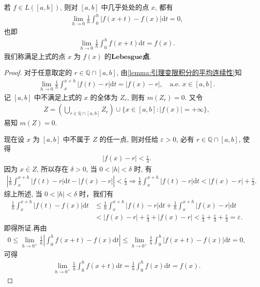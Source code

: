 \documentclass[../../main.tex]{subfiles}%
\begin{document}
\begin{corollary}\label{corollary:可积函数的Lebesgue点}
若 $f\in L([a,b])$, 则对 $[a,b]$ 中几乎处处的点 $x$, 都有
\begin{align*}
\lim_{h\rightarrow 0} \frac{1}{h}\int_0^h{\left| f\left( x+t \right) -f\left( x \right) \right|\mathrm{d}t}=0,
\end{align*}
也即
\begin{align*}
\lim_{h\rightarrow 0} \frac{1}{h}\int_0^h{f\left( x+t \right) \mathrm{d}t}=f\left( x \right) .
\end{align*}
我们称满足上式的点 $x$ 为 $f(x)$ 的$\mathbf{Lebesgue}$\textbf{点}.
\end{corollary}
\begin{proof}
对于任意取定的 $r\in\mathbb{Q}\cap[a,b]$, 由\cref{lemma:引理变限积分的平均连续性}知
\begin{align*}
\lim_{h\to 0} \frac{1}{h}\int_x^{x+h} |f(t)-r|\mathrm{d}t = |f(x)-r|, \quad \text{a.e. } x\in[a,b].
\end{align*}
记 $[a,b]$ 中不满足上式的 $x$ 的全体为 $Z_r$, 则有 $m(Z_r)=0$. 又令
\begin{align*}
Z = \left(\bigcup_{r\in\mathbb{Q}\cap[a,b]} Z_r\right) \cup \{x\in[a,b]: |f(x)|=+\infty\},
\end{align*}
易知 $m(Z)=0$.

现在设 $x$ 为 $[a,b]$ 中不属于 $Z$ 的任一点, 则对任给 $\varepsilon>0$, 必有 $r\in\mathbb{Q}\cap[a,b]$, 使得
\begin{align*}
|f(x)-r|<\frac{\varepsilon}{3}.
\end{align*}
因为 $x\overline{\in}Z$, 所以存在 $\delta>0$, 当 $0<|h|<\delta$ 时, 有
\begin{align*}
\left|\frac{1}{h}\int_x^{x+h} |f(t)-r|\mathrm{d}t - |f(x)-r|\right| < \frac{\varepsilon}{3}\Longrightarrow \frac{1}{h}\int_x^{x+h}{\left| f\left( t \right) -r \right|\mathrm{d}t}<\left| f\left( x \right) -r \right|+\frac{\varepsilon}{3}.
\end{align*}
综上所述, 当 $0<|h|<\delta$ 时，我们有
\begin{align*}
\frac{1}{h}\int_x^{x+h}{\left| f\left( t \right) -f\left( x \right) \right|\mathrm{d}t}&\leqslant \frac{1}{h}\int_x^{x+h}{\left| f\left( t \right) -r \right|\mathrm{d}t}+\frac{1}{h}\int_x^{x+h}{\left| f\left( x \right) -r \right|\mathrm{d}t}
\\
&<\left| f\left( x \right) -r \right|+\frac{\varepsilon}{3}+\left| f\left( x \right) -r \right|<\frac{\varepsilon}{3}+\frac{\varepsilon}{3}+\frac{\varepsilon}{3}=\varepsilon .
\end{align*}
即得所证.再由
\begin{align*}
0\leqslant \lim\limits_{h\rightarrow 0^+} \frac{1}{h}\left| \int_0^h{f\left( x+t \right) -f\left( x \right) \mathrm{d}t} \right|\leqslant \lim\limits_{h\rightarrow 0^+} \frac{1}{h}\int_0^h{\left| f\left( x+t \right) -f\left( x \right) \right|\mathrm{d}t}=0,
\end{align*}
可得
\begin{align*}
\lim_{h\rightarrow 0^+} \frac{1}{h}\int_0^h{f\left( x+t \right) \mathrm{d}t}=\frac{1}{h}\int_0^h{f\left( x \right) \mathrm{d}t}=f\left( x \right) .
\end{align*}
\end{proof}
\end{document}

